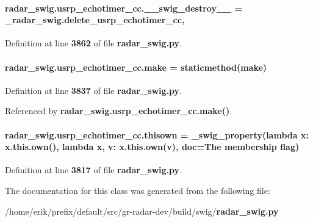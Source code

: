 \paragraph[{\+\_\+\+\_\+swig\+\_\+destroy\+\_\+\+\_\+}]{\setlength{\rightskip}{0pt plus 5cm}radar\+\_\+swig.\+usrp\+\_\+echotimer\+\_\+cc.\+\_\+\+\_\+swig\+\_\+destroy\+\_\+\+\_\+ = \+\_\+radar\+\_\+swig.\+delete\+\_\+usrp\+\_\+echotimer\+\_\+cc\hspace{0.3cm}{\ttfamily [static]}, {\ttfamily [private]}}\label{classradar__swig_1_1usrp__echotimer__cc_a05068346e6279822577d9c35b9f11db3}


Definition at line {\bf 3862} of file {\bf radar\+\_\+swig.\+py}.

\paragraph[{make}]{\setlength{\rightskip}{0pt plus 5cm}radar\+\_\+swig.\+usrp\+\_\+echotimer\+\_\+cc.\+make = staticmethod(make)\hspace{0.3cm}{\ttfamily [static]}}\label{classradar__swig_1_1usrp__echotimer__cc_a0367e4885794fbb2bf56811c50f520a0}


Definition at line {\bf 3837} of file {\bf radar\+\_\+swig.\+py}.



Referenced by {\bf radar\+\_\+swig.\+usrp\+\_\+echotimer\+\_\+cc.\+make()}.

\paragraph[{thisown}]{\setlength{\rightskip}{0pt plus 5cm}radar\+\_\+swig.\+usrp\+\_\+echotimer\+\_\+cc.\+thisown = {\bf \+\_\+swig\+\_\+property}(lambda x\+: x.\+this.\+own(), lambda {\bf x}, v\+: x.\+this.\+own(v), doc=\textquotesingle{}The membership flag\textquotesingle{})\hspace{0.3cm}{\ttfamily [static]}}\label{classradar__swig_1_1usrp__echotimer__cc_aba98b3b7316edc4a3ba3b24e49047a32}


Definition at line {\bf 3817} of file {\bf radar\+\_\+swig.\+py}.



The documentation for this class was generated from the following file\+:\begin{DoxyCompactItemize}
\item 
/home/erik/prefix/default/src/gr-\/radar-\/dev/build/swig/{\bf radar\+\_\+swig.\+py}\end{DoxyCompactItemize}
